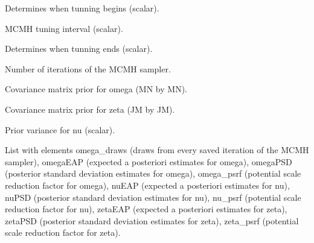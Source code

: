 \documentclass[a4paper]{book}
\begin{document}
\begin{Arguments}
\begin{ldescription}
\item[\code{min\_tune}] Determines when tunning begins (scalar).

\item[\code{tune\_int}] MCMH tuning interval (scalar).

\item[\code{max\_tune}] Determines when tunning ends (scalar).

\item[\code{niter}] Number of iterations of the MCMH sampler.

\item[\code{omega\_sigma}] Covariance matrix prior for omega (MN by MN).

\item[\code{zeta\_sigma@}] Covariance matrix prior for zeta (JM by JM).

\item[\code{nu\_sigma@}] Prior variance for nu (scalar).
\end{ldescription}
\end{Arguments}
%
\begin{Value}
List with elements omega\_draws (draws from every saved iteration of
the MCMH sampler), omegaEAP (expected a posteriori estimates for omega),
omegaPSD (posterior standard deviation estimates for omega), omega\_psrf
(potential scale reduction factor for omega), nuEAP (expected a posteriori
estimates for nu), nuPSD (posterior standard deviation estimates for nu),
nu\_psrf (potential scale reduction factor for nu), zetaEAP (expected a
posteriori estimates for zeta), zetaPSD (posterior standard deviation
estimates for zeta), zeta\_psrf (potential scale reduction factor for zeta).
\end{Value}
%
\begin{Examples}
\end{Examples}
\end{document}
